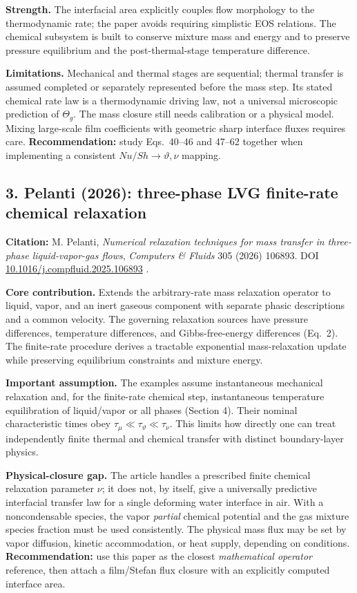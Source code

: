 \documentclass[11pt,letterpaper]{article}
\begin{document}
\textbf{Strength.} The interfacial area explicitly couples flow morphology to the thermodynamic rate; the paper avoids requiring simplistic EOS relations. The chemical subsystem is built to conserve mixture mass and energy and to preserve pressure equilibrium and the post-thermal-stage temperature difference.

\textbf{Limitations.} Mechanical and thermal stages are sequential; thermal transfer is assumed completed or separately represented before the mass step. Its stated chemical rate law is a thermodynamic driving law, not a universal microscopic prediction of $\Theta_g$. The mass closure still needs calibration or a physical model. Mixing large-scale film coefficients with geometric sharp interface fluxes requires care. \textbf{Recommendation:} study Eqs.~40--46 and 47--62 together when implementing a consistent $Nu/Sh\to\vartheta,\nu$ mapping.

\subsection{3. Pelanti (2026): three-phase LVG finite-rate chemical relaxation}
\textbf{Citation:} M. Pelanti, \emph{Numerical relaxation techniques for mass transfer in three-phase liquid-vapor-gas flows}, \emph{Computers \& Fluids} 305 (2026) 106893. DOI \href{https://doi.org/10.1016/j.compfluid.2025.106893}{10.1016/j.compfluid.2025.106893} \cite{Pelanti2026}.

\textbf{Core contribution.} Extends the arbitrary-rate mass relaxation operator to liquid, vapor, and an inert gaseous component with separate phasic descriptions and a common velocity. The governing relaxation sources have pressure differences, temperature differences, and Gibbs-free-energy differences (Eq.~2). The finite-rate procedure derives a tractable exponential mass-relaxation update while preserving equilibrium constraints and mixture energy.

\textbf{Important assumption.} The examples assume instantaneous mechanical relaxation and, for the finite-rate chemical step, instantaneous temperature equilibration of liquid/vapor or all phases (Section 4). Their nominal characteristic times obey $\tau_\mu\ll\tau_\vartheta\ll\tau_\nu$. This limits how directly one can treat independently finite thermal and chemical transfer with distinct boundary-layer physics.

\textbf{Physical-closure gap.} The article handles a prescribed finite chemical relaxation parameter $\nu$; it does not, by itself, give a universally predictive interfacial transfer law for a single deforming water interface in air. With a noncondensable species, the vapor \emph{partial} chemical potential and the gas mixture species fraction must be used consistently. The physical mass flux may be set by vapor diffusion, kinetic accommodation, or heat supply, depending on conditions. \textbf{Recommendation:} use this paper as the closest \emph{mathematical operator} reference, then attach a film/Stefan flux closure with an explicitly computed interface area.
\end{document}
